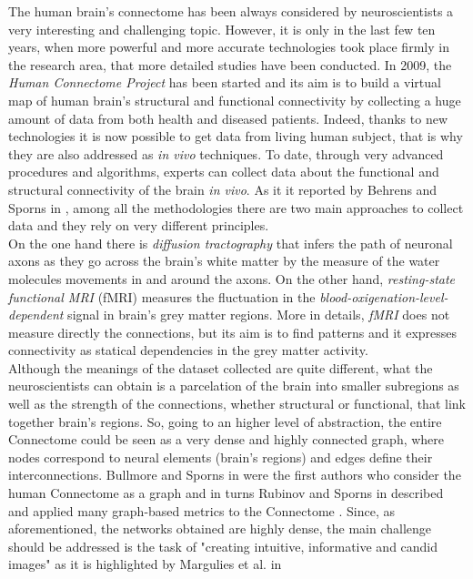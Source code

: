 \documentclass{article}
\begin{document}
\begin{multicols}{2}
The human brain's connectome has been always considered by neuroscientists a very interesting and challenging topic. However, it is only in the last few ten years, when more powerful and more accurate technologies took place firmly in the research area, that more detailed studies have been conducted. In 2009, the \textit{Human Connectome Project} \cite{humanconnectomeproject} has been started and its aim is to build a virtual map of human brain's structural and functional connectivity by collecting a huge amount of data from both health and diseased patients. Indeed, thanks to new technologies it is now possible to get data from living human subject, that is why they are also addressed as \textit{in vivo} techniques. To date, through very advanced procedures and algorithms, experts can collect data about the functional and structural connectivity of the brain \textit{in vivo}. As it it reported by Behrens and Sporns in \cite{humanConnectomics}, among all the methodologies there are two main approaches to collect data and they rely on very different principles. \\
On the one hand there is \textit{diffusion tractography} that infers the path of neuronal axons as they go across the brain's white matter by the measure of the water molecules movements in and around the axons. On the other hand, \textit{resting-state functional MRI} (fMRI) measures the fluctuation in the \textit{blood-oxigenation-level-dependent} signal in brain's grey matter regions. More in details, \textit{fMRI} does not measure directly the connections, but its aim is to find patterns and it expresses connectivity as statical dependencies in the grey matter activity. \\
Although the meanings of the dataset collected are quite different, what the neuroscientists can obtain is a parcelation of the brain into smaller subregions as well as the strength of the connections, whether structural or functional, that link together brain's regions. So, going to an higher level of abstraction, the entire Connectome could be seen as a very dense and highly connected graph, where nodes correspond to neural elements (brain's regions) and edges define their interconnections. Bullmore and Sporns in \cite{bullmore2009complex} were the first authors who consider the human Connectome as a graph and in turns Rubinov and Sporns in \cite{complexNetworkMeasures} described and applied many graph-based metrics to the Connectome . Since, as aforementioned, the networks obtained are highly dense, the main challenge should be addressed is the task of "creating intuitive, informative and candid images" as it is highlighted by Margulies et al. in \cite{visualizingHumanConnectome}



\end{multicols}
\end{document}

